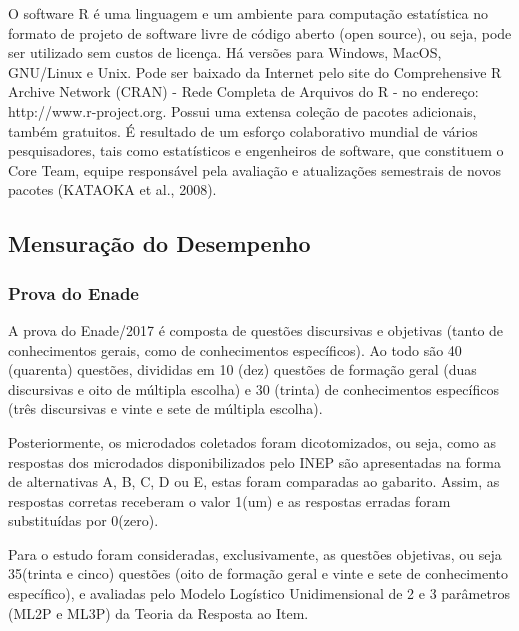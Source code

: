 \documentclass[12pt]{article}
\begin{document}
O software R é uma linguagem e um ambiente para computação estatística no formato de projeto de software livre de código aberto (open source), ou seja, pode ser utilizado sem custos de licença. Há versões para Windows, MacOS, GNU/Linux e Unix. Pode ser baixado da Internet pelo site do Comprehensive R Archive Network (CRAN) - Rede Completa de Arquivos do R - no endereço: http://www.r-project.org. Possui uma extensa coleção de pacotes adicionais, também gratuitos. É resultado de um esforço colaborativo mundial de vários pesquisadores, tais como estatísticos e engenheiros de software, que constituem o Core Team, equipe responsável pela avaliação e atualizações semestrais de novos pacotes (KATAOKA et al., 2008).




\subsection{Mensuração do Desempenho}
\subsubsection{Prova do Enade}
\label{sec:MET}

A prova do Enade/2017 é composta de questões discursivas e objetivas (tanto de conhecimentos gerais, como de conhecimentos específicos). Ao todo são 40 (quarenta) questões, divididas em 10 (dez) questões de formação geral (duas discursivas e oito de múltipla escolha) e 30 (trinta) de conhecimentos específicos (três discursivas e vinte e sete de múltipla escolha).\vskip0.3cm

Posteriormente, os microdados coletados foram dicotomizados, ou seja, como as respostas dos microdados disponibilizados pelo INEP são apresentadas na forma de alternativas A, B, C, D ou E, estas foram comparadas ao gabarito. Assim, as respostas corretas receberam o valor 1(um) e as respostas erradas foram substituídas por 0(zero). 

Para o estudo foram consideradas, exclusivamente, as questões objetivas, ou seja 35(trinta e cinco) questões (oito de formação geral e vinte e sete de conhecimento específico), e avaliadas pelo Modelo Logístico Unidimensional de 2 e 3 parâmetros (ML2P e ML3P) da Teoria da Resposta ao Item.
\end{document}
